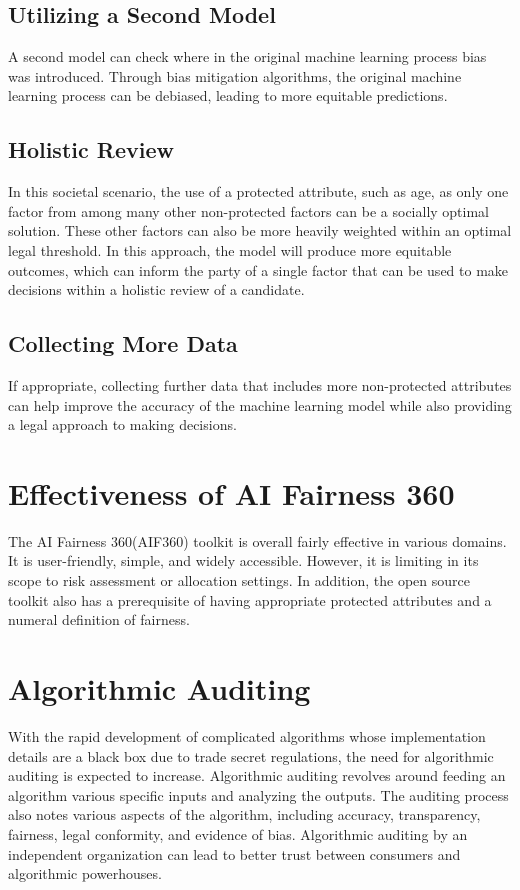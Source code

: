 \documentclass{article}
\begin{document}
\subsection{Utilizing a Second Model}

A second model can check where in the original machine learning process bias was introduced. Through bias mitigation algorithms, the original machine learning process can be debiased, leading to more equitable predictions. 


\subsection{Holistic Review}

In this societal scenario, the use of a protected attribute, such as age, as only one factor from among many other non-protected factors can be a socially optimal solution. These other factors can also be more heavily weighted within an optimal legal threshold. In this approach, the model will produce more equitable outcomes, which can inform the party of a single factor that can be used to make decisions within a holistic review of a candidate.

\subsection{Collecting More Data}

If appropriate, collecting further data that includes more non-protected attributes can help improve the accuracy of the machine learning model while also providing a legal approach to making decisions. 

\section{Effectiveness of AI Fairness 360}

The AI Fairness 360(AIF360) toolkit is overall fairly effective in various domains. It is user-friendly, simple, and widely accessible. However, it is limiting in its scope to risk assessment or allocation settings. In addition, the open source toolkit also has a prerequisite of having appropriate protected attributes and a numeral definition of fairness. 

\section{Algorithmic Auditing}

With the rapid development of complicated algorithms whose implementation details are a black box due to trade secret regulations, the need for algorithmic auditing is expected to increase. Algorithmic auditing revolves around feeding an algorithm various specific inputs and analyzing the outputs. The auditing process also notes various aspects of the algorithm, including accuracy, transparency, fairness, legal conformity, and evidence of bias. Algorithmic auditing by an independent organization can lead to better trust between consumers and algorithmic powerhouses. 
\end{document}
